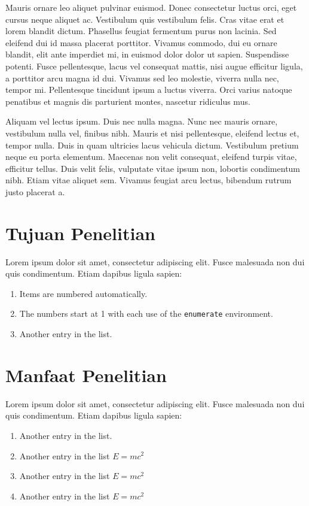     Mauris ornare leo aliquet pulvinar euismod. Donec consectetur luctus orci, eget cursus neque aliquet ac. Vestibulum quis vestibulum felis. Cras vitae erat et lorem blandit dictum. Phasellus feugiat fermentum purus non lacinia. Sed eleifend dui id massa placerat porttitor. Vivamus commodo, dui eu ornare blandit, elit ante imperdiet mi, in euismod dolor dolor ut sapien. Suspendisse potenti. Fusce pellentesque, lacus vel consequat mattis, nisi augue efficitur ligula, a porttitor arcu magna id dui. Vivamus sed leo molestie, viverra nulla nec, tempor mi. Pellentesque tincidunt ipsum a luctus viverra. Orci varius natoque penatibus et magnis dis parturient montes, nascetur ridiculus mus.\par

    Aliquam vel lectus ipsum. Duis nec nulla magna. Nunc nec mauris ornare, vestibulum nulla vel, finibus nibh. Mauris et nisi pellentesque, eleifend lectus et, tempor nulla. Duis in quam ultricies lacus vehicula dictum. Vestibulum pretium neque eu porta elementum. Maecenas non velit consequat, eleifend turpis vitae, efficitur tellus. Duis velit felis, vulputate vitae ipsum non, lobortis condimentum nibh. Etiam vitae aliquet sem. Vivamus feugiat arcu lectus, bibendum rutrum justo placerat a.\\

\section{Tujuan Penelitian}
    Lorem ipsum dolor sit amet, consectetur adipiscing elit. Fusce malesuada non dui quis condimentum. Etiam dapibus ligula sapien:
    \begin{enumerate}
        \item Items are numbered automatically.
        \item The numbers start at 1 with each use of the \texttt{enumerate} environment.
        \item Another entry in the list.\\
    \end{enumerate} 

\section{Manfaat Penelitian}
    Lorem ipsum dolor sit amet, consectetur adipiscing elit. Fusce malesuada non dui quis condimentum. Etiam dapibus ligula sapien:
    \begin{enumerate}
        \item Another entry in the list.
        \item Another entry in the list \(E = mc^2 \)
        \item Another entry in the list \(E = mc^2 \)
        \item Another entry in the list \(E = mc^2 \)
    \end{enumerate} 
    
